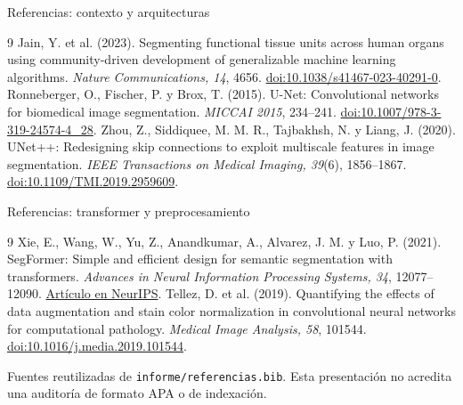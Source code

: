 \documentclass[aspectratio=169,11pt]{beamer}
\begin{document}
\begin{frame}{Referencias: contexto y arquitecturas}
  \scriptsize
  \begin{thebibliography}{9}
     Jain, Y. et al. (2023).
      Segmenting functional tissue units across human organs using community-driven
      development of generalizable machine learning algorithms.
      \textit{Nature Communications, 14}, 4656.
      \href{https://doi.org/10.1038/s41467-023-40291-0}{doi:10.1038/s41467-023-40291-0}.
     Ronneberger, O., Fischer, P. y Brox, T. (2015).
      U-Net: Convolutional networks for biomedical image segmentation.
      \textit{MICCAI 2015}, 234--241.
      \href{https://doi.org/10.1007/978-3-319-24574-4_28}{doi:10.1007/978-3-319-24574-4\_28}.
     Zhou, Z., Siddiquee, M. M. R., Tajbakhsh, N. y Liang, J. (2020).
      UNet++: Redesigning skip connections to exploit multiscale features in image segmentation.
      \textit{IEEE Transactions on Medical Imaging, 39}(6), 1856--1867.
      \href{https://doi.org/10.1109/TMI.2019.2959609}{doi:10.1109/TMI.2019.2959609}.
  \end{thebibliography}
\end{frame}

\begin{frame}{Referencias: transformer y preprocesamiento}
  \scriptsize
  \begin{thebibliography}{9}
     Xie, E., Wang, W., Yu, Z., Anandkumar, A., Alvarez, J. M. y Luo, P. (2021).
      SegFormer: Simple and efficient design for semantic segmentation with transformers.
      \textit{Advances in Neural Information Processing Systems, 34}, 12077--12090.
      \href{https://proceedings.neurips.cc/paper/2021/hash/64f1f27bf1b4ec22924fd0acb550c235-Abstract.html}{Artículo en NeurIPS}.
     Tellez, D. et al. (2019).
      Quantifying the effects of data augmentation and stain color normalization in
      convolutional neural networks for computational pathology.
      \textit{Medical Image Analysis, 58}, 101544.
      \href{https://doi.org/10.1016/j.media.2019.101544}{doi:10.1016/j.media.2019.101544}.
  \end{thebibliography}
  \small Fuentes reutilizadas de \texttt{informe/referencias.bib}.
  Esta presentación no acredita una auditoría de formato APA o de indexación.
\end{frame}
\end{document}
